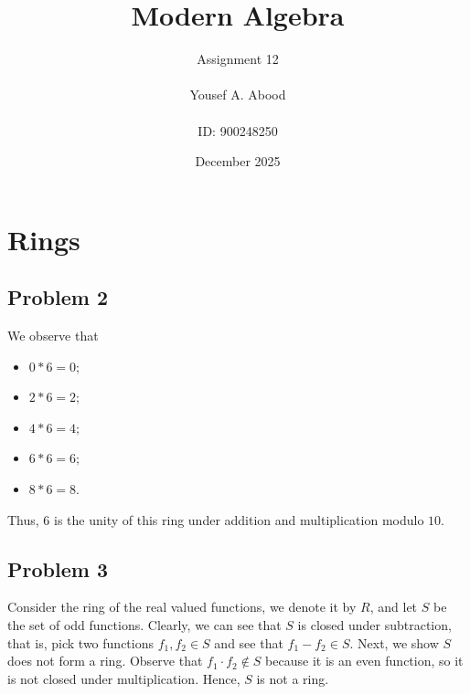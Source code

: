 \documentclass[a4paper,12pt]{article}
\title{Modern Algebra}
\author{Assignment 12\\ \\ Yousef A. Abood\\ \\ ID: 900248250}
\date{December 2025}
\begin{document}
\maketitle
\noindent\makebox[\linewidth]{\rule{15cm}{0.4pt}}
\section{Rings}
\subsection*{Problem 2}

We observe that 
\begin{itemize}
    \item $0*6=0;$
    \item $2*6=2;$
    \item $4*6=4;$
    \item $6*6=6;$
    \item $8*6=8.$
\end{itemize}
Thus, $6$ is the unity of this ring under addition and multiplication modulo $10.$
\subsection*{Problem 3}
Consider the ring of the real valued functions, we denote it by $R$, and let $S$ be the set of odd functions.
Clearly, we can see that $S$ is closed under subtraction, that is, pick two functions $f_1, f_2 \in S$ and see that $f_1-f_2 \in S.$ Next, we show $S$ does not form a ring. Observe that $f_1\cdot f_2 \notin S$ because it is an even function, so it is not closed under multiplication. Hence, $S$ is not a ring. 
\end{document}
